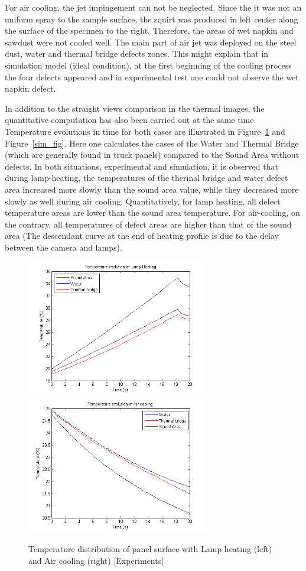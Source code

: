 \documentclass{tQRT2e}
\begin{document}
For air cooling, the jet impingement can not be neglected. Since the it was not an uniform spray to the sample surface, the squirt was produced in left center along the surface of the specimen to the right. Therefore, the areas of wet napkin and sawdust were not cooled well. The main part of air jet was deployed on the steel dust, water and thermal bridge defects zones. This might explain that in simulation model (ideal condition), at the first beginning of the cooling process the four defects appeared and in experimental test one could not observe the wet napkin defect.

In addition to the straight views comparison in the thermal images, the quantitative computation has also been carried out at the same time. Temperature evolutions in time for both cases are illustrated in Figure~\ref{exp_fig} and Figure~\ref{sim_fig}. Here one calculates the cases of the Water and Thermal Bridge (which are generally found in truck panels) compared to the Sound Area without defects. In both situations, experimental and simulation, it is observed that during lamp-heating, the temperatures of the thermal bridge and water defect area increased more slowly than the sound area value, while they decreased more slowly as well during air cooling. Quantitatively, for lamp heating, all defect temperature areas are lower than the sound area temperature. For air-cooling, on the contrary, all temperatures of defect areas are higher than that of the sound area (The descendant curve at the end of heating profile is due to the delay between the camera and lamps).  
\begin{figure}
	\includegraphics[width=8cm, height=6cm]{heating_evolution5}
	\includegraphics[width=8cm, height=6cm]{cooling_evolution4}
	\caption{Temperature distribution of panel surface with Lamp heating (left) and Air cooling (right) [Experiments]}
	\label{exp_fig}
\end{figure}
\end{document}
